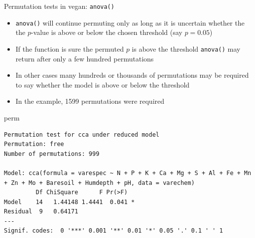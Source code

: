 \documentclass[10pt,ignorenonframetext,compress, aspectratio=169]{beamer}
\newenvironment{Shaded}{\begin{snugshade}}{\end{snugshade}}
\newcommand{\NormalTok}[1]{{#1}}
\begin{document}
\begin{frame}[fragile]{Permutation tests in vegan: \texttt{anova()}}

\begin{itemize}
\itemsep1pt\parskip0pt
\item
  \texttt{anova()} will continue permuting only as long as it is
  uncertain whether the the $p$-value is above or below the chosen
  threshold (say $p = 0.05$)
\item
  If the function is sure the permuted $p$ is above the threshold
  \texttt{anova()} may return after only a few hundred permutations
\item
  In other cases many hundreds or thousands of permutations may be
  required to say whether the model is above or below the threshold
\item
  In the example, 1599 permutations were required
\end{itemize}

\tiny

\begin{Shaded}
\begin{Highlighting}[]
\NormalTok{perm}
\end{Highlighting}
\end{Shaded}

\begin{verbatim}
Permutation test for cca under reduced model
Permutation: free
Number of permutations: 999

Model: cca(formula = varespec ~ N + P + K + Ca + Mg + S + Al + Fe + Mn + Zn + Mo + Baresoil + Humdepth + pH, data = varechem)
         Df ChiSquare      F Pr(>F)  
Model    14   1.44148 1.4441  0.041 *
Residual  9   0.64171                
---
Signif. codes:  0 '***' 0.001 '**' 0.01 '*' 0.05 '.' 0.1 ' ' 1
\end{verbatim}

\normalsize

\end{frame}
\end{document}
